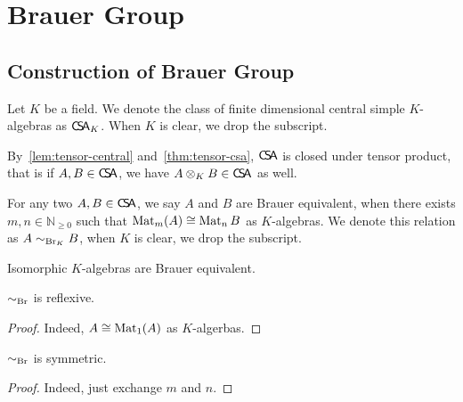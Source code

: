 \chapter{Brauer Group}\label{cha:brauer-group}

\section{Construction of Brauer Group}
Let $K$ be a field. We denote the class of finite dimensional central simple $K$-algebras as $\operatorname{\mathsf{C}\!\mathsf{S}\!\mathsf{A}}_{K}$. When $K$ is clear, we drop the subscript.

\begin{remark}
  By~\cref{lem:tensor-central} and~\cref{thm:tensor-csa}, $\operatorname{\mathsf{C}\!\mathsf{S}\!\mathsf{A}}$ is closed under tensor product, that is if $A, B\in\operatorname{\mathsf{C}\!\mathsf{S}\!\mathsf{A}}$, we have $A\otimes_{K} B\in\operatorname{\mathsf{C}\!\mathsf{S}\!\mathsf{A}}$ as well.
\end{remark}

\begin{definition}\label{def:br-eqv}
  For any two $A, B\in\operatorname{\mathsf{C}\!\mathsf{S}\!\mathsf{A}}$, we say $A$ and $B$ are Brauer equivalent, when there exists $m, n \in \mathbb{N}_{\ge0}$ such that $\operatorname{Mat}_{m}(A)\cong \operatorname{Mat}_{n}B$ as $K$-algebras. We denote this relation as $A\sim_{\operatorname{Br}_{K}} B$, when $K$ is clear, we drop the subscript.
\end{definition}

\begin{remark}
  Isomorphic $K$-algebras are Brauer equivalent.
\end{remark}

\begin{lemma}
  $\sim_{\operatorname{Br}}$ is reflexive.
  \leanok
\end{lemma}
\begin{proof}
  Indeed, $A \cong \operatorname{Mat}_{1}(A)$ as $K$-algerbas.
\end{proof}

\begin{lemma}
  $\sim_{\operatorname{Br}}$ is symmetric.
  \leanok
\end{lemma}
\begin{proof}
  Indeed, just exchange $m$ and $n$.
\end{proof}

